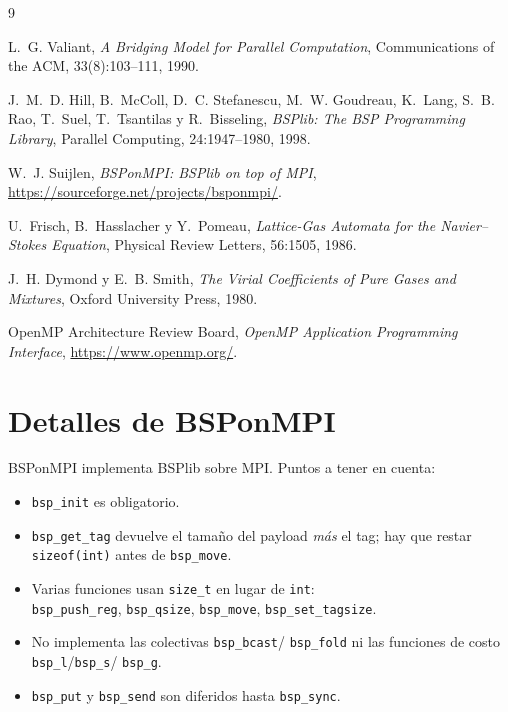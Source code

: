 \documentclass[11pt,a4paper]{article}
\begin{document}
\begin{thebibliography}{9}

L.~G. Valiant, \emph{A Bridging Model for Parallel Computation},
Communications of the ACM, 33(8):103--111, 1990.

J.~M.~D. Hill, B.~McColl, D.~C. Stefanescu, M.~W. Goudreau, K.~Lang,
S.~B. Rao, T.~Suel, T.~Tsantilas y R.~Bisseling,
\emph{BSPlib: The BSP Programming Library}, Parallel Computing, 24:1947--1980,
1998.

W.~J. Suijlen, \emph{BSPonMPI: BSPlib on top of MPI},
\url{https://sourceforge.net/projects/bsponmpi/}.

U.~Frisch, B.~Hasslacher y Y.~Pomeau,
\emph{Lattice-Gas Automata for the Navier--Stokes Equation},
Physical Review Letters, 56:1505, 1986.

J.~H. Dymond y E.~B. Smith,
\emph{The Virial Coefficients of Pure Gases and Mixtures},
Oxford University Press, 1980.

OpenMP Architecture Review Board, \emph{OpenMP Application Programming
Interface}, \url{https://www.openmp.org/}.

\end{thebibliography}

\appendix
\section{Detalles de BSPonMPI}

BSPonMPI implementa BSPlib sobre MPI. Puntos a tener en cuenta:
\begin{itemize}[leftmargin=*]
  \item \texttt{bsp\_init} es obligatorio.
  \item \texttt{bsp\_get\_tag} devuelve el tamaño del payload \emph{más} el
        tag; hay que restar \texttt{sizeof(int)} antes de \texttt{bsp\_move}.
  \item Varias funciones usan \texttt{size\_t} en lugar de \texttt{int}:\\
        \texttt{bsp\_push\_reg}, \texttt{bsp\_qsize}, \texttt{bsp\_move},
        \texttt{bsp\_set\_tagsize}.
  \item No implementa las colectivas \texttt{bsp\_bcast}/\allowbreak
        \texttt{bsp\_fold} ni las funciones de costo
        \texttt{bsp\_l}/\allowbreak \texttt{bsp\_s}/\allowbreak
        \texttt{bsp\_g}.
  \item \texttt{bsp\_put} y \texttt{bsp\_send} son diferidos hasta
        \texttt{bsp\_sync}.
\end{itemize}
\end{document}

